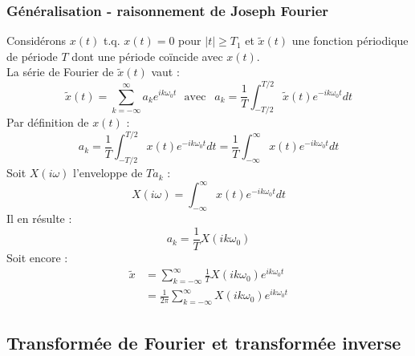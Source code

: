 		\subsubsection{Généralisation - raisonnement de Joseph Fourier}
		Considérons $x(t)$ t.q. $x(t) =0$ pour $|t|\geq T_1$ et $\tilde{
		x}(t)$ une fonction périodique de période $T$ dont une période 
		coïncide avec $x(t)$.\\
		La série de Fourier de $\tilde{x}(t)$ vaut : 
		\begin{equation}
		\tilde{x}(t) = \sum_{k=-\infty}^\infty a_ke^{ik\omega_0t}\ \ \
		\text{avec }\ \ a_k = \frac{1}{T}\int_{-T/2}^{T/2} \tilde{x}(t)
		e^{-ik\omega_0t}dt
		\end{equation}
		Par définition de $x(t)$ :
		\begin{equation}
		a_k  = \frac{1}{T}\int_{-T/2}^{T/2} x(t)e^{-ik\omega_0t}dt = \frac{1}
		{T}\int_{-\infty}^\infty x(t)e^{-ik\omega_0t}dt
		\end{equation}
		Soit $X(i\omega)$ l'enveloppe de $Ta_k$ :
		\begin{equation}
		X(i\omega) = \int_{-\infty}^\infty x(t)e^{-ik\omega_0t}dt
		\end{equation}
		Il en résulte :
		\begin{equation}
		a_k = \frac{1}{T}X(ik\omega_0)
		\end{equation}
		Soit encore : 
		\begin{equation}
		\begin{array}{ll}
		\tilde{x} &= \sum_{k=-\infty}^\infty \frac{1}{T}X(ik\omega_0)e^
		{ik\omega_0t}\\
		&= \frac{1}{2\pi}\sum_{k=-\infty}^\infty X(ik\omega_0)e^{ik
		\omega_0t}
		\end{array}
		\label{eq:ObtFourier}
		\end{equation}
		
		
	\subsection{Transformée de Fourier et transformée inverse}
	\ \\
	


